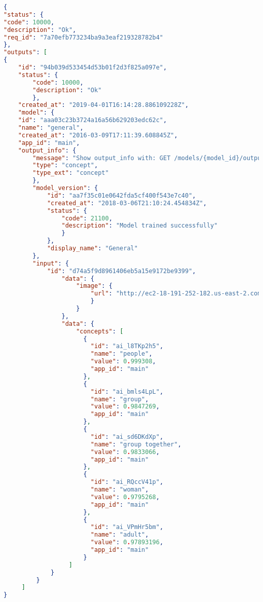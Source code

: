 \begin{lstlisting}[language=json,caption=een ingekorte versie van een ontvangen API response met voorspellingen van Clarifai .]
{
"status": {
"code": 10000,
"description": "Ok",
"req_id": "7a70efb773234ba9a3eaf219328782b4"
},
"outputs": [
{
    "id": "94b039d533454d53b01f2d3f825a097e",
    "status": {
        "code": 10000,
        "description": "Ok"
        },
    "created_at": "2019-04-01T16:14:28.886109228Z",
    "model": {
    "id": "aaa03c23b3724a16a56b629203edc62c",
    "name": "general",
    "created_at": "2016-03-09T17:11:39.608845Z",
    "app_id": "main",
    "output_info": {
        "message": "Show output_info with: GET /models/{model_id}/output_info",
        "type": "concept",
        "type_ext": "concept"
        },
        "model_version": {
            "id": "aa7f35c01e0642fda5cf400f543e7c40",
            "created_at": "2018-03-06T21:10:24.454834Z",
            "status": {
                "code": 21100,
                "description": "Model trained successfully"
                }
            },
            "display_name": "General"
        },
        "input": {
            "id": "d74a5f9d8961406eb5a15e9172be9399",
                "data": {
                    "image": {
                        "url": "http://ec2-18-191-252-182.us-east-2.compute.amazonaws.com:8182/iiif/2/FO-30-00197/full/full/0/default.jpg"
                        }
                    }
                },
                "data": {
                    "concepts": [
                      {
                        "id": "ai_l8TKp2h5",
                        "name": "people",
                        "value": 0.999308,
                        "app_id": "main"
                      },
                      {
                        "id": "ai_bmls4LpL",
                        "name": "group",
                        "value": 0.9847269,
                        "app_id": "main"
                      },
                      {
                        "id": "ai_sd6DKdXp",
                        "name": "group together",
                        "value": 0.9833066,
                        "app_id": "main"
                      },
                      {
                        "id": "ai_RQccV41p",
                        "name": "woman",
                        "value": 0.9795268,
                        "app_id": "main"
                      },
                      {
                        "id": "ai_VPmHr5bm",
                        "name": "adult",
                        "value": 0.97893196,
                        "app_id": "main"
                      }
                  ]
             }
         }
     ]
}

\end{lstlisting}

